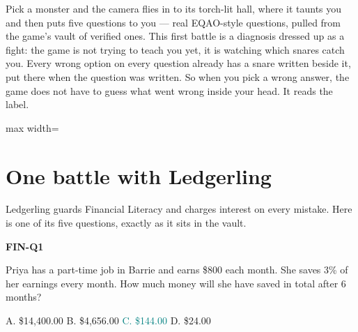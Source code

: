 \documentclass[11pt]{article}
\begin{document}
Pick a monster and the camera flies in to its torch-lit hall, where it taunts
you and then puts five questions to you --- real EQAO-style questions, pulled
from the game's vault of verified ones. This first battle is a diagnosis
dressed up as a fight: the game is not trying to teach you yet, it is watching
which snares catch you. Every wrong option on every question already has a snare
written beside it, put there when the question was written. So when you pick a
wrong answer, the game does not have to guess what went wrong inside your head.
It reads the label.

\vspace{0.5em}
\begin{center}
\begin{adjustbox}{max width=\textwidth}
\end{adjustbox}
\end{center}

\section{One battle with Ledgerling}

Ledgerling guards Financial Literacy and charges interest on every mistake.
Here is one of its five questions, exactly as it sits in the vault.

\begin{snarebox}
\textbf{FIN-Q1} 

\medskip
Priya has a part-time job in Barrie and earns \$800 each month. She saves 3\%
of her earnings every month. How much money will she have saved in total after
6 months?

\medskip
{\centering A. \$14,400.00 \quad B. \$4,656.00 \quad
\textcolor{Teal}{C. \$144.00} \quad D. \$24.00\par}
\end{snarebox}
\end{document}
